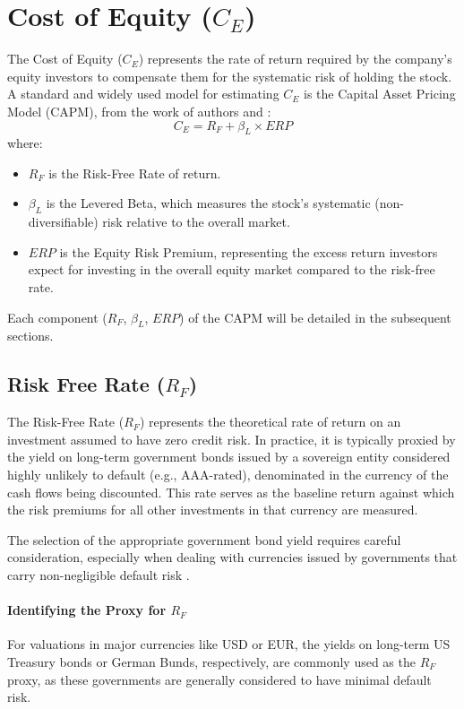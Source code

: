 \section{Cost of Equity (\(C_E\))} \label{sec:cost_of_equity}
The Cost of Equity (\(C_E\)) represents the rate of return required by the company's equity investors to compensate them for the systematic risk of holding the stock. A standard and widely used model for estimating \(C_E\) is the Capital Asset Pricing Model (CAPM), from the work of authors \textcite{sharpe1964beta} and \textcite{lintner1965beta}:
\begin{equation} \label{eq:cost_of_equity}
    C_E = R_F + \beta_L \times ERP
\end{equation}
where:
\begin{itemize}
    \item \(R_F\) is the Risk-Free Rate of return.
    \item \(\beta_L\) is the Levered Beta, which measures the stock's systematic (non-diversifiable) risk relative to the overall market.
    \item \(ERP\) is the Equity Risk Premium, representing the excess return investors expect for investing in the overall equity market compared to the risk-free rate.
\end{itemize}
Each component (\(R_F\), \(\beta_L\), \(ERP\)) of the CAPM will be detailed in the subsequent sections.

\subsection{Risk Free Rate (\(R_F\))} \label{sec:risk_free_rate}
The Risk-Free Rate (\(R_F\)) represents the theoretical rate of return on an investment assumed to have zero credit risk. In practice, it is typically proxied by the yield on long-term government bonds issued by a sovereign entity considered highly unlikely to default (e.g., AAA-rated), denominated in the currency of the cash flows being discounted. This rate serves as the baseline return against which the risk premiums for all other investments in that currency are measured.

The selection of the appropriate government bond yield requires careful consideration, especially when dealing with currencies issued by governments that carry non-negligible default risk \parencite{damodaran2025investment}.

\paragraph{Identifying the Proxy for \(R_F\)}
For valuations in major currencies like USD or EUR, the yields on long-term US Treasury bonds or German Bunds, respectively, are commonly used as the \(R_F\) proxy, as these governments are generally considered to have minimal default risk.

